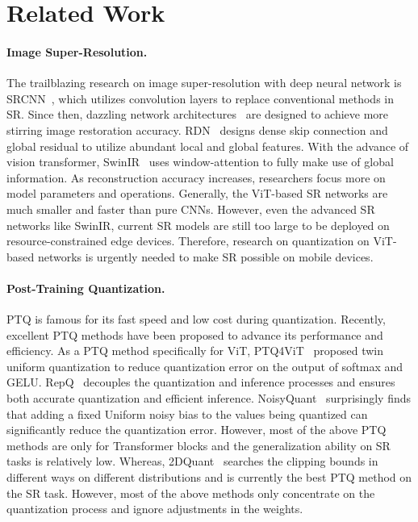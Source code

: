 \section{Related Work}
\vspace{-2mm}
\paragraph{Image Super-Resolution.}
The trailblazing research on image super-resolution with deep neural network is SRCNN~\cite{dong2016image}, which utilizes convolution layers to replace conventional methods in SR.
Since then, dazzling network architectures~\cite{chen2022cross,chen2023dual,lim2017enhanced,zhang2018image} are designed to achieve more stirring image restoration accuracy.
RDN~\cite{zhang2018residual} designs dense skip connection and global residual to utilize abundant local and global features.
With the advance of vision transformer, SwinIR~\cite{liang2021swinir} uses window-attention to fully make use of global information.
As reconstruction accuracy increases, researchers focus more on model parameters and operations.
Generally, the ViT-based SR networks are much smaller and faster than pure CNNs.
However, even the advanced SR networks like SwinIR, current SR models are still too large to be deployed on resource-constrained edge devices.
Therefore, research on quantization on ViT-based networks is urgently needed to make SR possible on mobile devices.

\vspace{-4mm}
\paragraph{Post-Training Quantization.}
PTQ is famous for its fast speed and low cost during quantization.
Recently, excellent PTQ methods have been proposed to advance its performance and efficiency.
As a PTQ method specifically for ViT, PTQ4ViT~\cite{yuan2022ptq4vit} proposed twin uniform quantization to reduce quantization error on the output of softmax and GELU.
RepQ~\cite{li2023repq} decouples the quantization and inference processes and ensures both accurate quantization and efficient inference.
NoisyQuant~\cite{liu2023noisyquant} surprisingly finds that adding a fixed Uniform noisy bias to the values being quantized can significantly reduce the quantization error.
However, most of the above PTQ methods are only for Transformer blocks and the generalization ability on SR tasks is relatively low.
Whereas, 
2DQuant~\cite{liu20242dquant} searches the clipping bounds in different ways on different distributions and is currently the best PTQ method on the SR task.
However, most of the above methods only concentrate on the quantization process and ignore adjustments in the weights. 

